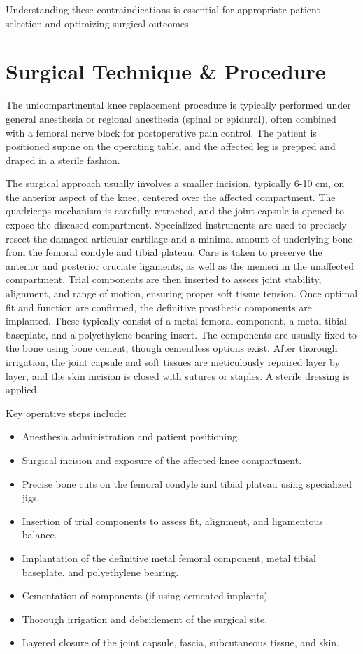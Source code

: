 Understanding these contraindications is essential for appropriate patient selection and optimizing surgical outcomes.

\section*{Surgical Technique \& Procedure}
The unicompartmental knee replacement procedure is typically performed under general anesthesia or regional anesthesia (spinal or epidural), often combined with a femoral nerve block for postoperative pain control. The patient is positioned supine on the operating table, and the affected leg is prepped and draped in a sterile fashion.

The surgical approach usually involves a smaller incision, typically 6-10 cm, on the anterior aspect of the knee, centered over the affected compartment. The quadriceps mechanism is carefully retracted, and the joint capsule is opened to expose the diseased compartment. Specialized instruments are used to precisely resect the damaged articular cartilage and a minimal amount of underlying bone from the femoral condyle and tibial plateau. Care is taken to preserve the anterior and posterior cruciate ligaments, as well as the menisci in the unaffected compartment. Trial components are then inserted to assess joint stability, alignment, and range of motion, ensuring proper soft tissue tension. Once optimal fit and function are confirmed, the definitive prosthetic components are implanted. These typically consist of a metal femoral component, a metal tibial baseplate, and a polyethylene bearing insert. The components are usually fixed to the bone using bone cement, though cementless options exist. After thorough irrigation, the joint capsule and soft tissues are meticulously repaired layer by layer, and the skin incision is closed with sutures or staples. A sterile dressing is applied.

Key operative steps include:

\begin{itemize}
  \item Anesthesia administration and patient positioning.
  \item Surgical incision and exposure of the affected knee compartment.
  \item Precise bone cuts on the femoral condyle and tibial plateau using specialized jigs.
  \item Insertion of trial components to assess fit, alignment, and ligamentous balance.
  \item Implantation of the definitive metal femoral component, metal tibial baseplate, and polyethylene bearing.
  \item Cementation of components (if using cemented implants).
  \item Thorough irrigation and debridement of the surgical site.
  \item Layered closure of the joint capsule, fascia, subcutaneous tissue, and skin.
\end{itemize}

